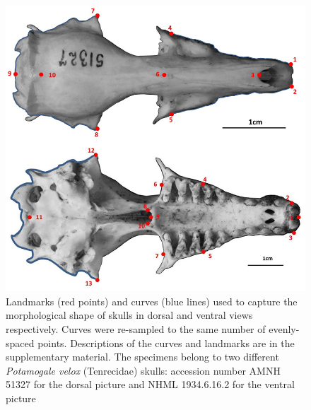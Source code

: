 \documentclass[12pt,a4paper]{article}
\begin{document}
	\begin{figure}
	\centering
	\includegraphics[width=1\linewidth]{figures/SkDors+Skvent_landmark_diagrams.png}
	
	\caption[Diagram of the landmarks and curves for the skulls in dorsal and ventral views]
		{Landmarks (red points) and curves (blue lines) used to capture the morphological shape of skulls in dorsal and ventral views respectively. Curves were re-sampled to the same number of evenly-spaced points. Descriptions of the curves and landmarks are in the supplementary material. The specimens belong to two different \textit{Potamogale velox} (Tenrecidae) skulls: accession number AMNH 51327 for the dorsal picture and NHML 1934.6.16.2 for the ventral picture}
	
	\label{fig:skdors_skvent_landmarks}
	\end{figure}
\end{document}
